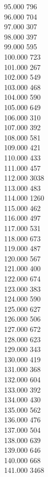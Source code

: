 { 95.000	796 \\
 96.000	704 \\
 97.000	307 \\
 98.000	397 \\
 99.000	595 \\
 100.000	723 \\
 101.000	267 \\
 102.000	549 \\
 103.000	468 \\
 104.000	590 \\
 105.000	649 \\
 106.000	310 \\
 107.000	392 \\
 108.000	581 \\
 109.000	421 \\
 110.000	433 \\
 111.000	457 \\
 112.000	3038 \\
 113.000	483 \\
 114.000	1260 \\
 115.000	462 \\
 116.000	497 \\
 117.000	531 \\
 118.000	673 \\
 119.000	487 \\
 120.000	567 \\
 121.000	400 \\
 122.000	674 \\
 123.000	383 \\
 124.000	590 \\
 125.000	627 \\
 126.000	506 \\
 127.000	672 \\
 128.000	623 \\
 129.000	343 \\
 130.000	419 \\
 131.000	368 \\
 132.000	604 \\
 133.000	392 \\
 134.000	430 \\
 135.000	562 \\
 136.000	476 \\
 137.000	504 \\
 138.000	639 \\
 139.000	646 \\
 140.000	668 \\
 141.000	3468 \\
}
